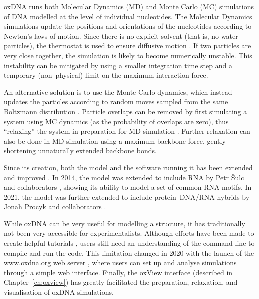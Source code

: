 oxDNA runs both Molecular Dynamics (MD) and Monte Carlo (MC) simulations of DNA modelled at the level of individual nucleotides. The Molecular Dynamics simulations update the positions and orientations of the nucleotides according to Newton's laws of motion. Since there is no explicit solvent (that is, no water particles), the thermostat is used to ensure diffusive motion \cite{sengar2021primer}. If two particles are very close together, the simulation is likely to become numerically unstable. This instability can be mitigated by using a smaller integration time step and a temporary (non--physical) limit on the maximum interaction force. 

An alternative solution is to use the Monte Carlo dynamics, which instead updates the particles according to random moves sampled from the same Boltzmann distribution \cite{sengar2021primer}. Particle overlaps can be removed by first simulating a system using MC dynamics (as the probability of overlaps are zero), thus ``relaxing'' the system in preparation for MD simulation \cite{doye2020oxdna}. Further relaxation can also be done in MD simulation using a maximum backbone force, gently shortening unnaturally extended backbone bonds. 

Since its creation, both the model and the software running it has been extended and improved \cite{ouldridge2011structural, rovigatti2015comparison, sulc2012Sequence, ouldridge2013optimizing, snodin2015introducing}. In 2014, the model was extended to include RNA by Petr {\v{S}}ulc and collaborators \cite{vsulc2014nucleotide}, showing its ability to model a set of common RNA motifs. In 2021, the model was further extended to include protein--DNA/RNA hybrids by Jonah Procyk and collaborators \cite{procyk2021coarse}.




While oxDNA can be very useful for modelling a structure, it has traditionally not been very accessible for experimentalists. Although efforts have been made to create helpful tutorials \cite{doye2020oxdna}, users still need an understanding of the command line to compile and run the code. This limitation changed in 2020 with the launch of the \url{www.oxdna.org} web server \cite{oxdna.org}, where users can set up and analyse simulations through a simple web interface. Finally, the oxView interface \cite{poppleton2020design, bohlin2022oxview} (described in Chapter~\ref{ch:oxview}) has greatly facilitated the preparation, relaxation, and visualisation of oxDNA simulations.

